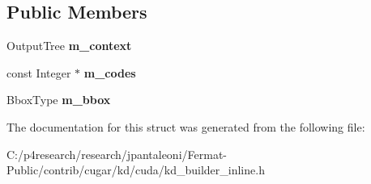 \subsection*{Public Members}
\begin{DoxyCompactItemize}
\item 
\mbox{\label{structcugar_1_1cuda_1_1kd_1_1_kd__context_a52ab77909d3881dfc42a64e547d54123}} 
Output\+Tree {\bfseries m\+\_\+context}
\item 
\mbox{\label{structcugar_1_1cuda_1_1kd_1_1_kd__context_ad2c8bd4db81c8d24ffe37e97245898bf}} 
const Integer $\ast$ {\bfseries m\+\_\+codes}
\item 
\mbox{\label{structcugar_1_1cuda_1_1kd_1_1_kd__context_a92bd2daf2f7ae63c9085fbbb4f62ec5b}} 
Bbox\+Type {\bfseries m\+\_\+bbox}
\end{DoxyCompactItemize}


The documentation for this struct was generated from the following file\+:\begin{DoxyCompactItemize}
\item 
C\+:/p4research/research/jpantaleoni/\+Fermat-\/\+Public/contrib/cugar/kd/cuda/kd\+\_\+builder\+\_\+inline.\+h\end{DoxyCompactItemize}
